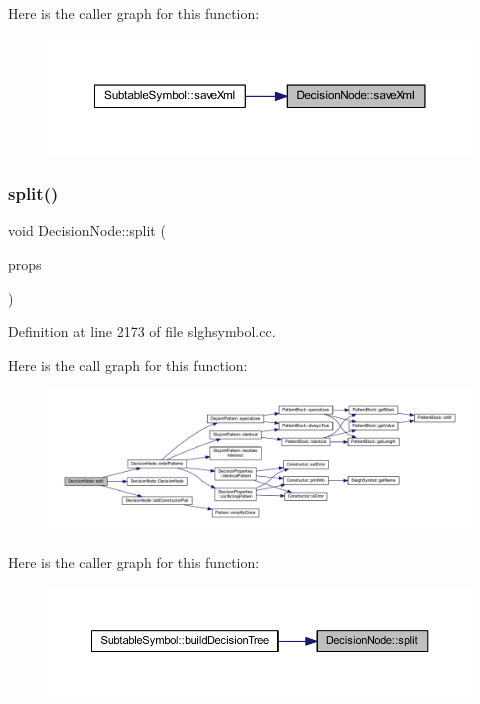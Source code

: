 Here is the caller graph for this function\+:
\nopagebreak
\begin{figure}[H]
\begin{center}
\leavevmode
\includegraphics[width=350pt]{class_decision_node_a2c1fb2500eafcafeb80c29bd44450c09_icgraph}
\end{center}
\end{figure}
\mbox{\label{class_decision_node_a9e5138d4016a89ea1f33db170a1b8b93}} 
\subsubsection{\texorpdfstring{split()}{split()}}
{\footnotesize\ttfamily void Decision\+Node\+::split (\begin{DoxyParamCaption}\item[{\mbox{\hyperlink{class_decision_properties}{Decision\+Properties}} \&}]{props }\end{DoxyParamCaption})}



Definition at line 2173 of file slghsymbol.\+cc.

Here is the call graph for this function\+:
\nopagebreak
\begin{figure}[H]
\begin{center}
\leavevmode
\includegraphics[width=350pt]{class_decision_node_a9e5138d4016a89ea1f33db170a1b8b93_cgraph}
\end{center}
\end{figure}
Here is the caller graph for this function\+:
\nopagebreak
\begin{figure}[H]
\begin{center}
\leavevmode
\includegraphics[width=350pt]{class_decision_node_a9e5138d4016a89ea1f33db170a1b8b93_icgraph}
\end{center}
\end{figure}


